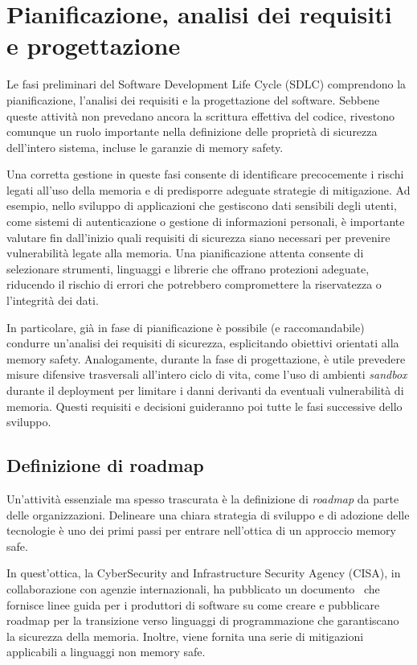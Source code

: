 \section{Pianificazione, analisi dei requisiti e progettazione}
\label{sec:planning_requirements_design}

Le fasi preliminari del Software Development Life Cycle (SDLC) comprendono la pianificazione,
l'analisi dei requisiti e la progettazione del software. Sebbene queste attività
non prevedano ancora la scrittura effettiva del codice, rivestono comunque un
ruolo importante nella definizione delle proprietà di sicurezza dell'intero
sistema, incluse le garanzie di memory safety.

Una corretta gestione in queste fasi consente di identificare precocemente i rischi
legati all'uso della memoria e di predisporre adeguate strategie di mitigazione.
Ad esempio, nello sviluppo di applicazioni che gestiscono dati sensibili degli utenti,
come sistemi di autenticazione o gestione di informazioni personali, è importante
valutare fin dall'inizio quali requisiti di sicurezza siano necessari per prevenire
vulnerabilità legate alla memoria. Una pianificazione attenta consente di
selezionare strumenti, linguaggi e librerie che offrano protezioni adeguate,
riducendo il rischio di errori che potrebbero compromettere la riservatezza o l'integrità
dei dati.

In particolare, già in fase di pianificazione è possibile (e raccomandabile) condurre
un'analisi dei requisiti di sicurezza, esplicitando obiettivi orientati alla
memory safety. Analogamente, durante la fase di progettazione, è utile prevedere
misure difensive trasversali all'intero ciclo di vita, come l'uso di ambienti
\textit{sandbox} durante il deployment per limitare i danni derivanti da eventuali
vulnerabilità di memoria. Questi requisiti e decisioni guideranno poi tutte le
fasi successive dello sviluppo.

\subsection{Definizione di roadmap}
\label{sec:roadmap} Un'attività essenziale ma spesso trascurata è la definizione
di \textit{roadmap} da parte delle organizzazioni. Delineare una chiara
strategia di sviluppo e di adozione delle tecnologie è uno dei primi passi per
entrare nell'ottica di un approccio memory safe.

In quest'ottica, la CyberSecurity and Infrastructure Security Agency (CISA), in
collaborazione con agenzie internazionali, ha pubblicato un documento~\cite{memory_safe_roadmaps}
che fornisce linee guida per i produttori di software su come creare e
pubblicare roadmap per la transizione verso linguaggi di programmazione che
garantiscano la sicurezza della memoria. Inoltre, viene fornita una serie di
mitigazioni applicabili a linguaggi non memory safe.

